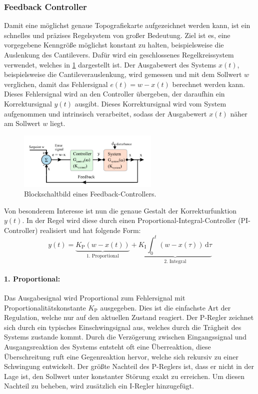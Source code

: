 \subsubsection{Feedback Controller}
Damit eine möglichst genaue Topografiekarte aufgezeichnet werden kann, ist ein schnelles und präzises Regelsystem von
großer Bedeutung.
Ziel ist es, eine vorgegebene Kenngröße möglichst konstant zu halten, beispielsweise die Auslenkung des Cantilevers.
Dafür wird ein geschlossenes Regelkreissystem verwendet, welches in \cref{fig:afm_controller} dargestellt ist.
Der Ausgabewert des Systems $x(t)$, beispielsweise die Cantileverauslenkung, wird gemessen und mit dem
Sollwert $w$ verglichen, damit das Fehlersignal $e(t)=w-x(t)$ berechnet werden kann.
Dieses Fehlersignal wird an den Controller übergeben, der daraufhin ein Korrektursignal $y(t)$ ausgibt.
Dieses Korrektursignal wird vom System aufgenommen und intrinsisch verarbeitet, sodass der Ausgabewert $x(t)$ näher am
Sollwert $w$ liegt.\autocite[99-101]{afm-buch}
\begin{figure}
    \centering
    \includegraphics[width=0.6\textwidth]{../assets/messmethoden/afm/03_controller}
    \caption{Blockschaltbild eines Feedback-Controllers. }
    \label{fig:afm_controller}
\end{figure}
Von besonderem Interesse ist nun die genaue Gestalt der Korrekturfunktion $y(t)$.
In der Regel wird diese durch einen Proportional-Integral-Controller (PI-Controller) realisiert und hat folgende Form:
\begin{equation*}
    y(t)=\underbrace{ K_{\mathrm{P}}(w-x(t)) }_{ \text{1. Proportional} }+\underbrace{ K_{\mathrm{I}}\int_{0}^{t}
        (w-x(\tau)) \, \mathrm{d}\tau }_{ \text{2. Integral} }
\end{equation*}\autocite[104-105]{afm-buch}

\paragraph{1. Proportional:}
Das Ausgabesignal wird Proportional zum Fehlersignal mit Proportionalitätskonstante $K_{\mathrm{P}}$ ausgegeben.
Dies ist die einfachste Art der Regulation, welche nur auf den aktuellen Zustand reagiert.
Der P-Regler zeichnet sich durch ein typisches Einschwingsignal aus, welches durch die Trägheit des Systems zustande
kommt.
Durch die Verzögerung zwischen Eingangssignal und Ausgangsreaktion des Systems entsteht oft eine Überreaktion,
diese Überschreitung ruft eine Gegenreaktion hervor, welche sich rekursiv zu einer Schwingung entwickelt.
Der größte Nachteil des P-Reglers ist, dass er nicht in der Lage ist, den Sollwert unter konstanter Störung
exakt zu erreichen.
Um diesen Nachteil zu beheben, wird zusätzlich ein I-Regler hinzugefügt.\autocite[101-102]{afm-buch}

